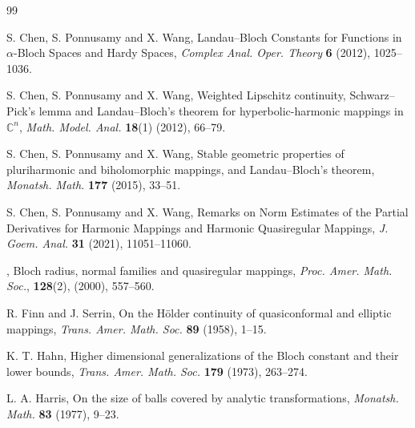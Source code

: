 \documentclass[a4paper,12pt,reqno]{amsart}
\theoremstyle{plain}
\theoremstyle{definition}
\newcommand{\IC}{{\mathbb C}}
\numberwithin{equation}{section}
\begin{document}
\begin{thebibliography}{99}
 
   {\sc S. Chen}, {\sc S. Ponnusamy} and {\sc X. Wang}, Landau–Bloch Constants for Functions in $\alpha$-Bloch Spaces and Hardy Spaces, {\it  Complex Anal. Oper. Theory} {\bf 6} (2012), 1025--1036. 

 
   {\sc S. Chen}, {\sc S. Ponnusamy} and {\sc X. Wang}, Weighted Lipschitz continuity, Schwarz–Pick’s lemma and Landau–Bloch’s theorem for hyperbolic-harmonic mappings in $\IC^n$, {\it  Math. Model. Anal.} {\bf 18}(1) (2012), 66--79. 
   
  {\sc S. Chen}, {\sc S. Ponnusamy} and {\sc X. Wang}, Stable geometric properties of pluriharmonic and biholomorphic mappings, and Landau–Bloch’s theorem, {\it Monatsh. Math.} {\bf 177} (2015), 33--51.   
 
 
   {\sc S. Chen}, {\sc S. Ponnusamy} and {\sc X. Wang}, Remarks on Norm Estimates of the Partial Derivatives for Harmonic Mappings and Harmonic Quasiregular Mappings, {\it  J. Goem. Anal.} {\bf 31} (2021), 11051--11060. 
  
  
   , Bloch radius, normal families and quasiregular mappings, {\it Proc. Amer. Math. Soc.}, {\bf 128}(2), (2000), 557--560.
  
    {\sc R. Finn} and {\sc J. Serrin}, On the H\"{o}lder continuity of quasiconformal and elliptic mappings, {\it  Trans. Amer. Math. Soc.} {\bf 89} (1958), 1--15.

 
   {\sc K. T. Hahn}, Higher dimensional generalizations of the Bloch constant and their lower bounds, {\it Trans. Amer. Math. Soc.} {\bf 179} (1973), 263--274. 
  
  
   {\sc L. A. Harris}, On the size of balls covered by analytic transformations, {\it Monatsh. Math.} {\bf 83} (1977), 9--23. 
   


\end{thebibliography}
\end{document}
